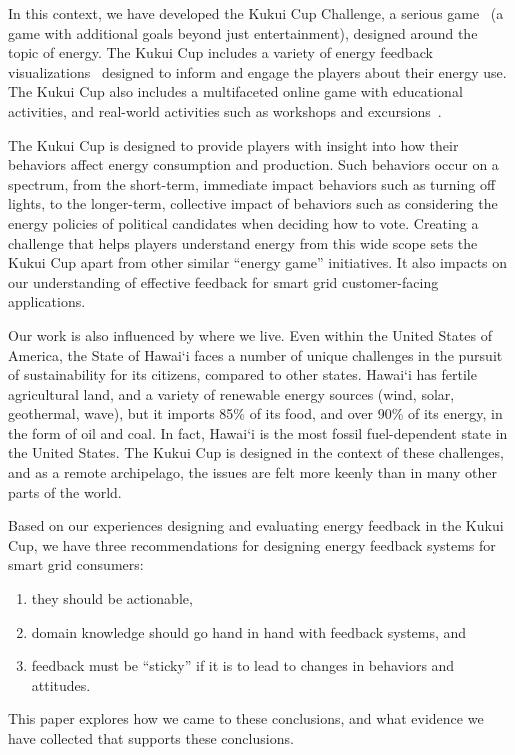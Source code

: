 \documentclass[10pt, conference, compsocconf]{IEEEtran-old}
\begin{document}
In this context, we have developed the Kukui Cup Challenge, a serious game~\cite{Zyda2005} (a game with additional goals beyond just entertainment), designed around the topic of energy. The Kukui Cup includes a variety of energy feedback visualizations~\cite{Froehlich2010} designed to inform and engage the players about their energy use. The Kukui Cup also includes a multifaceted online game with educational activities, and real-world activities such as workshops and excursions~\cite{csdl2-10-07, csdl2-10-08}.

The Kukui Cup is designed to provide players with insight into how their behaviors affect energy consumption and production. Such behaviors occur on a spectrum, from the short-term, immediate impact behaviors such as turning off lights, to the longer-term, collective impact of behaviors such as considering the energy policies of political candidates when deciding how to vote. Creating a challenge that helps players understand energy from this wide scope sets the Kukui Cup apart from other similar ``energy game'' initiatives. It also impacts on our understanding of effective feedback for smart grid customer-facing applications.

Our work is also influenced by where we live. Even within the United States of America, the State of Hawai`i faces a number of unique challenges in the pursuit of sustainability for its citizens, compared to other states. Hawai`i has fertile agricultural land, and a variety of renewable energy sources (wind, solar, geothermal, wave), but it imports 85\% of its food, and over 90\% of its energy, in the form of oil and coal. In fact, Hawai`i is the most fossil fuel-dependent state in the United States. The Kukui Cup is designed in the context of these challenges, and as a remote archipelago, the issues are felt more keenly than in many other parts of the world.

Based on our experiences designing and evaluating energy feedback in the Kukui Cup, we have three recommendations for designing energy feedback systems for smart grid consumers:
\begin{enumerate}
	\item they should be actionable,
	\item domain knowledge should go hand in hand with feedback systems, and
	\item feedback must be ``sticky'' if it is to lead to changes in behaviors and attitudes.
\end{enumerate}
This paper explores how we came to these conclusions, and what evidence we have collected that supports these conclusions.
\end{document}
